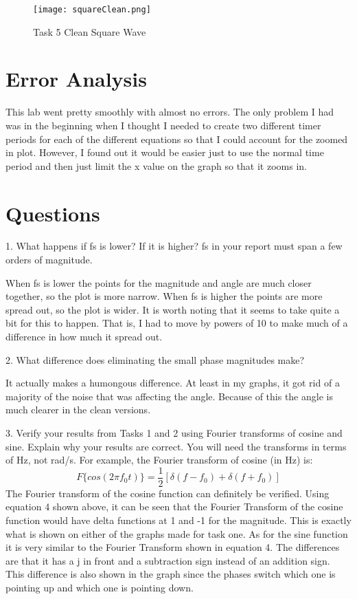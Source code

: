 \documentclass[12pt]{report}
\begin{document}
\begin{figure}[H]
\begin{center}
\caption{Task 5 Clean Square Wave}
\texttt{[image: squareClean.png]}
\end{center}
\end{figure}

\section{Error Analysis}
This lab went pretty smoothly with almost no errors. The only problem
I had was in the beginning when I thought I needed to create two
different timer periods for each of the different equations
so that I could account for the zoomed in plot. However,
I found out it would be easier just to use the normal time period and
then just limit the x value on the graph so that it zooms in.

\section{Questions}
1. What happens if fs is lower? If it is higher? fs in your report must span a few orders of magnitude.

When fs is lower the points for the magnitude and angle are much closer together,
so the plot is more narrow. When fs is higher the points are more spread out,
so the plot is wider. It is worth noting that it seems to take quite a bit
for this to happen. That is, I had to move by powers of 10 to make much of
a difference in how much it spread out.

2. What difference does eliminating the small phase magnitudes make?

It actually makes a humongous difference. At least in my graphs, it got
rid of a majority of the noise that was affecting the angle. Because of
this the angle is much clearer in the clean versions.

3. Verify your results from Tasks 1 and 2 using Fourier transforms of
cosine and sine. Explain why your results are correct. You will need the
transforms in terms of Hz, not rad/s. For example, the Fourier transform
of cosine (in Hz) is:
\begin{equation}
    F\{cos(2\pi f_{0}t)\} = \frac{1}{2}[\delta(f − f_{0}) + \delta(f + f_{0})]
\end{equation}
The Fourier transform of the cosine function can definitely be verified.
Using equation 4 shown above, it can be seen that the Fourier Transform
of the cosine function would have delta functions at 1 and -1 for the
magnitude. This is exactly what is shown on either of the graphs made
for task one. As for the sine function it is very similar to the Fourier
Transform shown in equation 4. The differences are that it has a j in
front and a subtraction sign instead of an addition sign. This difference
is also shown in the graph since the phases switch which one is pointing
up and which one is pointing down.
\end{document}
